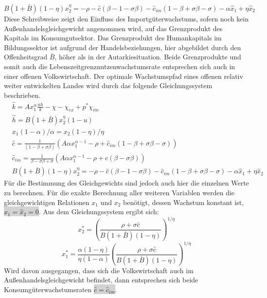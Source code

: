 \begin{equation}\boxed{
B(1+\bar{B})(1-\eta)x_2^\eta=-\rho-\hat{c}(\beta-1-\sigma\beta)-\hat{c}_{im}(1-\beta+\sigma\beta-\sigma)-\alpha\hat{x}_1+\eta\hat{x}_2}
\end{equation}
Diese Schreibweise zeigt den Einfluss des Importgüterwachstums, sofern noch kein Au{\ss}enhandelsgleichgewicht angenommen wird, auf das Grenzprodukt des Kapitals im Konsumgutsektor. Das Grenzprodukt des Humankapitals im Bildungssektor ist aufgrund der Handelsbeziehungen, hier abgebildet durch den Offenheitsgrad $\bar{B}$, höher als in der Autarkiesituation. Beide Grenzprodukte und somit auch die Lebenszeitgrenznutzenwachstumsrate entsprechen sich auch in einer offenen Volkswirtschaft.
Der optimale Wachstumspfad eines offenen relativ weiter entwickelten Landes wird durch das folgende Gleichungssystem beschrieben. 
\begin{align}
&\hat{k}=Ax_1^\alpha \frac{uh}{k}-\chi-\chi_{ex}+p^*\chi_{im}\\
&\hat{h}=B(1+\bar{B})x_2^\eta(1-u)\\
& x_1(1-\alpha)/\alpha =x_2(1-\eta)/\eta\\
&\hat{c}=\frac{1}{(1-\beta+\sigma\beta)}\left(A\alpha x_1^{\alpha -1}-\rho+\hat{c}_{im}(1-\beta+\sigma\beta-\sigma)\right)\\
&\hat{c}_{im}=\frac{1}{\beta-\sigma\beta+ \sigma}\left(A\alpha x_1^{\alpha -1}-\rho+\hat{c}(\beta - \sigma\beta)\right)\\
&B(1+\bar{B})(1-\eta)x_2^\eta=-\rho-\hat{c}(\beta-1-\sigma\beta)-\hat{c}_{im}(1-\beta+\sigma\beta-\sigma)-\alpha\hat{x}_1+\eta\hat{x}_2
\end{align}
Für die Bestimmung des Gleichgewichts sind jedoch auch hier die einzelnen Werte zu berechnen. Für die exakte Berechnung aller weiteren Variablen werden die gleichgewichtigen Relationen $x_1$ und $x_2$ benötigt, dessen Wachstum konstant ist,  
\colorbox{lightgray}{$\hat{x}_1=\hat{x}_2=0$}. Aus dem Gleichungssystem ergibt sich: 
\begin{equation}
x_2^*=\left(\frac{\rho+\sigma\hat{c}}{B(1+\bar{B})(1-\eta)}\right)^{1/\eta}
\end{equation}
\begin{equation}
x_1^* =\frac{\alpha(1-\eta)}{\eta(1-\alpha)}\left(\frac{\rho+\sigma\hat{c}}{B(1+\bar{B})(1-\eta)}\right)^{1/\eta}
\end{equation}
Wird davon ausgegangen, dass sich die Volkswirtschaft auch im Au{\ss}enhandelsgleichgewicht befindet, dann entsprechen sich beide Konsumgüterwachstumsraten \colorbox{lightgray}{$\hat{c}=\hat{c}_{im}$}. 
